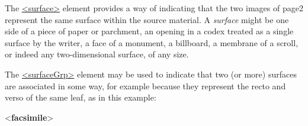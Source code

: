 The \hyperref[TEI.surface]{<surface>} element provides a way of indicating that the two images of page2 represent the same surface within the source material. A \textit{surface} might be one side of a piece of paper or parchment, an opening in a codex treated as a single surface by the writer, a face of a monument, a billboard, a membrane of a scroll, or indeed any two-dimensional surface, of any size.\par
The \hyperref[TEI.surfaceGrp]{<surfaceGrp>} element may be used to indicate that two (or more) surfaces are associated in some way, for example because they represent the recto and verso of the same leaf, as in this example: \par\bgroup{}\exampleFont \begin{shaded}\noindent\mbox{}{<\textbf{facsimile}>}\mbox{}\newline 
{}\mbox{}\newline 
\hspace*{1em}\mbox{}\newline 
\hspace*{1em}\hspace*{1em}\mbox{}\newline 
\hspace*{1em}\mbox{}\newline 
\hspace*{1em}\mbox{}\newline 
\hspace*{1em}\hspace*{1em}\mbox{}\newline 

\end{shaded}
